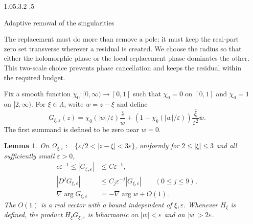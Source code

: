 \documentclass[11pt,a4paper,leqno]{amsart}
\makeatletter
\numberwithin{equation}{section}
\theoremstyle{landisplain}
\newtheorem{lemma}[theorem]{Lemma}
\theoremstyle{landisdefinition}
\theoremstyle{landisremark}
\newcommand{\eps}{\varepsilon}
\renewcommand\section{\Needspace{7\baselineskip}\@startsection{section}{1}{\z@}%
  {1.05\baselineskip \@plus .3\baselineskip \@minus .2\baselineskip}%
  {.5\baselineskip}%
  {\normalfont\large\bfseries\raggedright}}
\makeatother
\begin{document}
\section{Adaptive removal of the singularities}
\label{sec:adaptive}

The replacement must do more than remove a pole: it must keep
the real-part zero set transverse wherever a residual is created.
We choose the radius so that either the holomorphic phase or the
local replacement phase dominates the other. This two-scale choice
prevents phase cancellation and keeps the residual within the
required budget.

Fix a smooth function $\chi_0:[0,\infty)\to[0,1]$ such that
$\chi_0=0$ on $[0,1]$ and $\chi_0=1$ on $[2,\infty)$.
For $\xi\in\Lambda$, write $w=z-\xi$ and define
\begin{equation}\label{eq:G}
 G_{\xi,\eps}(z)
 =\chi_0(|w|/\eps)\frac{\bar z}{w}
 +(1-\chi_0(|w|/\eps))\frac{\bar\xi}{\eps^2}\bar w.
\end{equation}
The first summand is defined to be zero near $w=0$.

\begin{lemma}\label{lem:G}
On $\Omega_{\xi,\eps}:=\{\eps/2<|z-\xi|<3\eps\}$, uniformly for
$2\le|\xi|\le3$ and all sufficiently small $\eps>0$,
\begin{align}
 c\eps^{-1}\le |G_{\xi,\eps}|&\le C\eps^{-1},\label{eq:Gsize}\\
 |D^jG_{\xi,\eps}|&\le C_j\eps^{-j}|G_{\xi,\eps}|
                      \qquad(0\le j\le9),\label{eq:Gder}\\
 \nabla\arg G_{\xi,\eps}&=-\nabla\arg w+O(1).\label{eq:Gphase}
\end{align}
The $O(1)$ is a real vector with a bound independent of $\xi,\eps$.
Whenever $H_\xi$ is defined, the product $H_\xi G_{\xi,\eps}$ is
biharmonic on $|w|<\eps$ and on $|w|>2\eps$.
\end{lemma}
\end{document}
